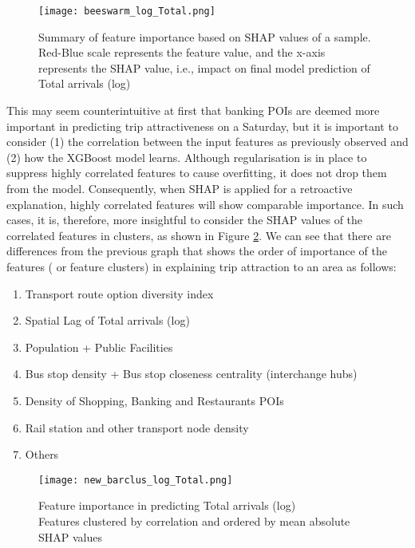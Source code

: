 \begin{figure}[!ht]
    \centering
    \texttt{[image: beeswarm\_log\_Total.png]}
    \captionsetup{justification=centering}
    \caption{Summary of feature importance based on SHAP values of a sample. Red-Blue scale represents the feature value, and the x-axis represents the SHAP value, i.e., impact on final model prediction of Total arrivals (log)}
    \label{fig:beeswarmtotal}
\end{figure}

This may seem counterintuitive at first that banking POIs are deemed more important in predicting trip attractiveness on a Saturday, but it is important to consider (1) the correlation between the input features as previously observed and (2) how the XGBoost model learns. Although regularisation is in place to suppress highly correlated features to cause overfitting, it does not drop them from the model. Consequently, when SHAP is applied for a retroactive explanation, highly correlated features will show comparable importance. In such cases, it is, therefore, more insightful to consider the SHAP values of the correlated features in clusters, as shown in Figure \ref{fig:barclustertotal}. We can see that there are differences from the previous graph that shows the order of importance of the features ( or feature clusters) in explaining trip attraction to an area as follows:

\begin{enumerate}
    \setlength\itemsep{0em}
    \item Transport route option diversity index
    \item Spatial Lag of Total arrivals (log)
    \item Population + Public Facilities
    \item Bus stop density + Bus stop closeness centrality (interchange hubs)
    \item Density of Shopping, Banking and Restaurants POIs
    \item Rail station and other transport node density
    \item Others
\end{enumerate}

\begin{figure}[ht]
    \centering
    \texttt{[image: new\_barclus\_log\_Total.png]}
    \captionsetup{justification=centering}
    \caption{Feature importance in predicting Total arrivals (log)\\ Features clustered by correlation and ordered by mean absolute SHAP values}
    \label{fig:barclustertotal}
\end{figure}


